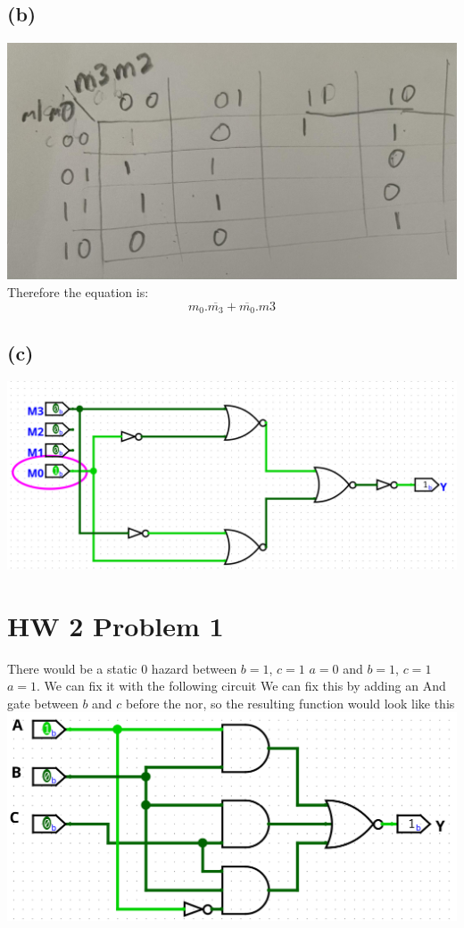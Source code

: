 \documentclass[12pt]{article}
\begin{document}
\subsection*{(b)}
\includegraphics[scale=0.15]{Problem7Kmap.jpg}\\
Therefore the equation is:
$$\boxed{m_0.\overline{m_3}+\overline{m_0}.m3}$$
\subsection*{(c)}
\includegraphics[scale=0.25]{Problem7Partc.png}
\section*{HW 2 Problem 1}
There would be a static 0 hazard between $b=1$, $c=1$ $a=0$ and $b=1$, $c=1$ $a=1$. We can fix it with the following circuit
We can fix this by adding an And gate between $b$ and $c$ before the nor, so the resulting function would look like this
\includegraphics[scale=0.25]{Problem1.png}
\end{document}
